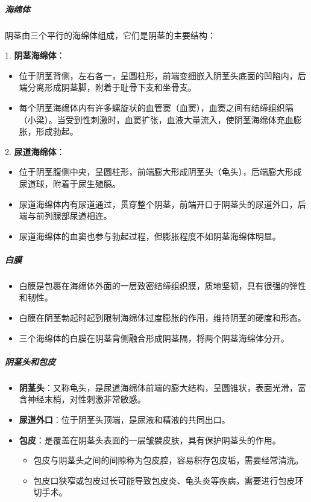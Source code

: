 \subparagraph{海绵体}
阴茎由三个平行的海绵体组成，它们是阴茎的主要结构：

1. \textbf{阴茎海绵体}：
  \begin{itemize}
  \item 位于阴茎背侧，左右各一，呈圆柱形，前端变细嵌入阴茎头底面的凹陷内，后端分离形成阴茎脚，附着于耻骨下支和坐骨支。
  \item 每个阴茎海绵体内有许多螺旋状的血管窦（血窦），血窦之间有结缔组织隔（小梁）。当受到性刺激时，血窦扩张，血液大量流入，使阴茎海绵体充血膨胀，形成勃起。
  \end{itemize}

2. \textbf{尿道海绵体}：
  \begin{itemize}
  \item 位于阴茎腹侧中央，呈圆柱形，前端膨大形成阴茎头（龟头），后端膨大形成尿道球，附着于尿生殖膈。
  \item 尿道海绵体内有尿道通过，贯穿整个阴茎，前端开口于阴茎头的尿道外口，后端与前列腺部尿道相连。
  \item 尿道海绵体的血窦也参与勃起过程，但膨胀程度不如阴茎海绵体明显。
  \end{itemize}

\subparagraph{白膜}
\begin{itemize}
\item 白膜是包裹在海绵体外面的一层致密结缔组织膜，质地坚韧，具有很强的弹性和韧性。
\item 白膜在阴茎勃起时起到限制海绵体过度膨胀的作用，维持阴茎的硬度和形态。
\item 三个海绵体的白膜在阴茎背侧融合形成阴茎隔，将两个阴茎海绵体分开。
\end{itemize}

\subparagraph{阴茎头和包皮}
\begin{itemize}
\item \textbf{阴茎头}：又称龟头，是尿道海绵体前端的膨大结构，呈圆锥状，表面光滑，富含神经末梢，对性刺激非常敏感。
\item \textbf{尿道外口}：位于阴茎头顶端，是尿液和精液的共同出口。
\item \textbf{包皮}：是覆盖在阴茎头表面的一层皱襞皮肤，具有保护阴茎头的作用。
  \begin{itemize}
  \item 包皮与阴茎头之间的间隙称为包皮腔，容易积存包皮垢，需要经常清洗。
  \item 包皮口狭窄或包皮过长可能导致包皮炎、龟头炎等疾病，需要进行包皮环切手术。
  \end{itemize}
\end{itemize}

